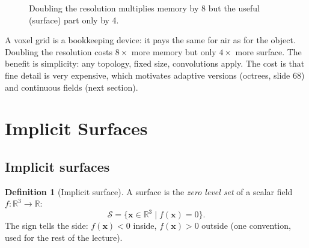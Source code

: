 \documentclass[11pt,a4paper]{article}
\newcommand{\R}{\mathbb{R}}
\newcommand{\Surf}{\mathcal{S}}
\newcommand{\vx}{\bm{x}}
\theoremstyle{definition}
\newtheorem{definition}{Definition}[section]
\theoremstyle{plain}
\theoremstyle{remark}
\begin{document}
\begin{figure}[ht]
\centering
{}
\caption{Doubling the resolution multiplies memory by 8 but the useful (surface) part only by 4.}
\end{figure}

\begin{intuition}
A voxel grid is a bookkeeping device: it pays the same for air as for the object. Doubling the resolution costs $8\times$ more memory but only $4\times$ more surface. The benefit is simplicity: any topology, fixed size, convolutions apply. The cost is that fine detail is very expensive, which motivates adaptive versions (octrees, slide 68) and continuous fields (next section).
\end{intuition}

\section{Implicit Surfaces }

\subsection{Implicit surfaces }
\begin{definition}[Implicit surface]
A surface is the \emph{zero level set} of a scalar field $f:\R^3\to\R$:
\[
\Surf=\{\vx\in\R^3\mid f(\vx)=0\}.
\]
The sign tells the side: $f(\vx)<0$ inside, $f(\vx)>0$ outside (one convention, used for the rest of the lecture).
\end{definition}
\end{document}
